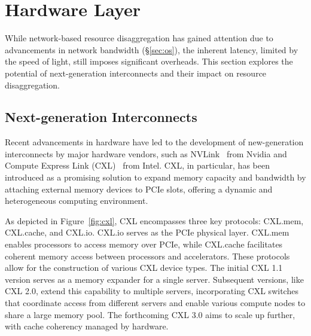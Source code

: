 \chapter{Hardware Layer}
\label{chap:hardware}
\begin{comment}

\begin{figure*}[t]
    \centering
      \texttt{[image: cxl]}
      \caption{\textbf{CXL Overview}} 
    \label{fig:cxl} \vspace{-1.0em}
    \end{figure*}

\begin{figure}[t]
    \centering
      \texttt{[image: cxl\_performance]}\vspace{-1.0em}
      \caption{\textbf{CXL Performance for Read-only Workload.} CXL denotes accessing memory through Compute Express Link, while DRAM refers to traditional memory access. The '-r' suffix indicates remote socket access.} \vspace{-2.0em}
    \label{fig:cxlperformance}
    \end{figure}
    
\end{comment}
While network-based resource disaggregation has gained attention due to advancements in network bandwidth (\S\ref{sec:os}), the inherent latency, limited by the speed of light, still imposes significant overheads. This section explores the potential of next-generation interconnects and their impact on resource disaggregation.

\section{Next-generation Interconnects}

Recent advancements in hardware have led to the development of new-generation interconnects by major hardware vendors, such as NVLink~\cite{nvlink} from Nvidia and Compute Express Link (CXL)~\cite{cxl} from Intel. CXL, in particular, has been introduced as a promising solution to expand memory capacity and bandwidth by attaching external memory devices to PCIe slots, offering a dynamic and heterogeneous computing environment.

As depicted in Figure~\ref{fig:cxl}, CXL encompasses three key protocols: CXL.mem, CXL.cache, and CXL.io. CXL.io serves as the PCIe physical layer. CXL.mem enables processors to access memory over PCIe, while CXL.cache facilitates coherent memory access between processors and accelerators. These protocols allow for the construction of various CXL device types. The initial CXL 1.1 version serves as a memory expander for a single server. Subsequent versions, like CXL 2.0, extend this capability to multiple servers, incorporating CXL switches that coordinate access from different servers and enable various compute nodes to share a large memory pool. The forthcoming CXL 3.0 aims to scale up further, with cache coherency managed by hardware.

